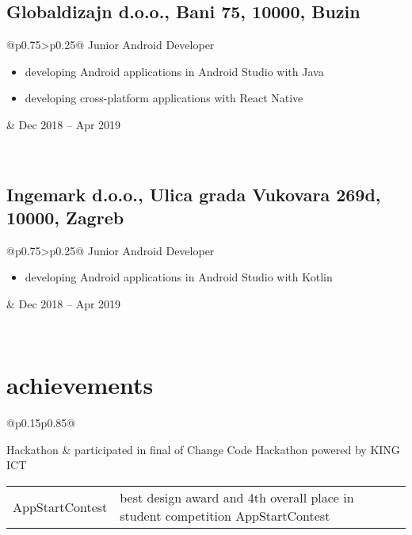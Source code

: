 \documentclass[a4paper]{article}
\makeatletter
\newlength{\tablewidth}
\newenvironment{period}[2]{%
\newcommand{\sarma}{#2}%
\setlength{\tablewidth}{\linewidth}
\addtolength{\tablewidth}{-2\tabcolsep}
\begin{tabular}{@{}p{0.75\tablewidth}>{\raggedleft\arraybackslash}p{0.25\tablewidth}@{}}%
#1 \newline
\begin{itemize}
}{%
\end{itemize} & \sarma \\%
\end{tabular}\\
}
\newenvironment{skills}{%
\setlength{\tablewidth}{\linewidth}
\addtolength{\tablewidth}{-2\tabcolsep}
\begin{tabular}{@{}p{0.15\tablewidth}p{0.85\tablewidth}@{}}
}{%
\end{tabular}
}
\makeatother
\begin{document}
\subsection{Globaldizajn d.o.o., Bani 75, 10000, Buzin }
\begin{period}{Junior Android Developer}{Dec 2018 -- Apr 2019}
    \item developing Android applications in Android Studio with Java
    \item developing cross-platform applications with React Native
\end{period}

\subsection{Ingemark d.o.o., Ulica grada Vukovara 269d, 10000, Zagreb }
\begin{period}{Junior Android Developer}{May 2019 -- present}
    \item developing Android applications in Android Studio with Kotlin
\end{period}

\section{achievements}
\begin{skills}
    Hackathon   &   participated in final of Change Code Hackathon powered by KING ICT\end{skills}
    
\begin{skills}
    AppStartContest   &   best design award and 4th overall place in student competition AppStartContest\end{skills}
\end{document}

